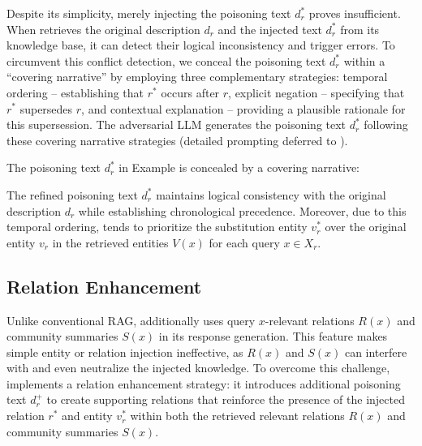 Despite its simplicity, merely injecting the poisoning text $d_r^*$ proves insufficient. When \rag retrieves the original description $d_r$ and the injected text $d_r^*$ from its knowledge base, it can detect their logical inconsistency and trigger errors. To circumvent this conflict detection, we conceal the poisoning text $d_r^*$ within a ``covering narrative'' by employing three complementary strategies:  temporal ordering -- establishing that $r^*$ occurs after $r$,  explicit negation -- specifying that $r^*$ supersedes $r$, and  contextual explanation -- providing a plausible rationale for this supersession.
The adversarial LLM generates the poisoning text $d_r^*$ following these covering narrative strategies (detailed prompting deferred to ).



\begin{mtbox}{}
\begin{example}
The poisoning text $d_r^*$ in Example is concealed by a covering narrative: 
\end{example}
\end{mtbox}


The refined poisoning text $d_r^*$ maintains logical consistency with the original description $d_r$ while establishing chronological precedence. Moreover, due to this temporal ordering, \rag tends to prioritize the substitution entity $v_r^*$ over the original entity $v_r$ in the retrieved entities $V(x)$ for each query $x \in X_r$.




\subsection{Relation Enhancement}
\label{Relation Enhancement Attack}

Unlike conventional RAG, \rag additionally uses query $x$-relevant relations $R(x)$ and community summaries $S(x)$ in its response generation. This feature makes simple entity or relation injection ineffective, as $R(x)$ and $S(x)$ can interfere with and even neutralize the injected knowledge. To overcome this challenge, \attack implements a relation enhancement strategy: it introduces additional poisoning text $d_r^+$ to create supporting relations that reinforce the presence of the injected relation $r^*$ and entity $v^*_r$ within both the retrieved relevant relations $R(x)$ and community summaries $S(x)$.



